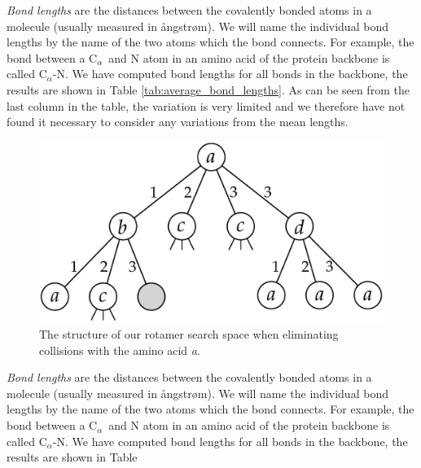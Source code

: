 \documentclass[a0,portrait]{a0poster}
\newcommand{\Ca}{C$_{\alpha}${}}
\begin{document}
\begin{GridBlock}{0}{75}{48}
\textit{Bond lengths} are the distances between the covalently bonded atoms
in a molecule (usually measured in ångstrøm). We will name the
individual bond lengths by the name of the two atoms which the bond
connects. For example, the bond between a \Ca\ and N atom in an amino acid of
the protein backbone is called \Ca -N. We have computed bond lengths
for all bonds in the backbone, the results are shown in Table
\ref{tab:average_bond_lengths}. As can be seen from the last column in
the table, the variation is very limited and we therefore have not
found it necessary to consider any variations from the mean
lengths.
\end{GridBlock}

\begin{GridBlock}{51}{75}{48}
\begin{figure}
    \centering
    \includegraphics[width=.45\textwidth]{../rapport/figures/rotamersearch}
    \caption{The structure of our rotamer search space when
      eliminating collisions with the amino acid \textit{a}.}
    \label{fig:rotamer-search-tree}
\end{figure}
\textit{Bond lengths} are the distances between the covalently bonded atoms
in a molecule (usually measured in ångstrøm). We will name the
individual bond lengths by the name of the two atoms which the bond
connects. For example, the bond between a \Ca\ and N atom in an amino acid of
the protein backbone is called \Ca -N. We have computed bond lengths
for all bonds in the backbone, the results are shown in Table
\end{GridBlock}

\end{document}
